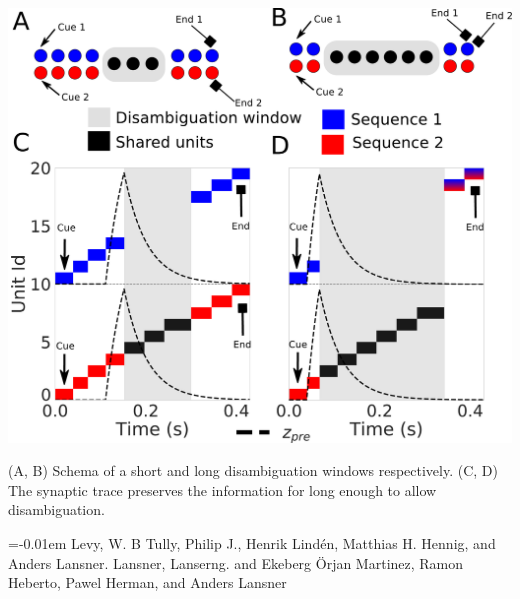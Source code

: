 \documentclass[landscape , a0, final]{baposter}
\begin{document}
\begin{poster}
{\begin{center}
\includegraphics[scale=0.15]{disambiguation_details.pdf}

\smaller (A, B) Schema of a short and long disambiguation windows respectively. (C, D) The synaptic trace preserves the information for long enough to allow disambiguation.  
\end{center}
 
	
}







   {
    \smaller
    \vspace{-0.4em}
    
    \renewcommand{\section}[2]{\vskip 0.05em}
      \begin{thebibliography}{1}\itemsep=-0.01em
      \setlength{\baselineskip}{0.4em}
      \vspace{5pt}
      Levy, W. B 
       Tully, Philip J., Henrik Lind\'en, Matthias H. Hennig, and Anders Lansner. 
      \vspace{5pt}
        Lansner, Lanserng. and Ekeberg {\"O}rjan
      \vspace{5pt}
         Martinez, Ramon Heberto, Pawel Herman, and Anders Lansner
      \end{thebibliography} 
  }



\end{poster}
\end{document}
